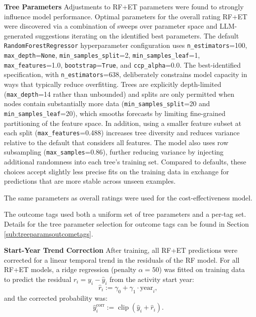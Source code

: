 \documentclass[12pt,a4paper]{article}
\begin{document}
\textbf{Tree Parameters} Adjustments to RF+ET parameters were found to strongly influence model performance. Optimal parameters for the overall rating RF+ET were discovered via a combination of sweeps over parameter space and LLM-generated suggestions iterating on the identified best parameters. The default \texttt{RandomForestRegressor} hyperparameter configuration uses \texttt{n\_estimators}=100, \texttt{max\_depth}=\texttt{None}, \texttt{min\_samples\_split}=2, \texttt{min\_samples\_leaf}=1, \texttt{max\_features}=1.0, \texttt{bootstrap}=\texttt{True}, and \texttt{ccp\_alpha}=0.0. The best-identified specification, with \texttt{n\_estimators}=638, deliberately constrains model capacity in ways that typically reduce overfitting. Trees are explicitly depth-limited (\texttt{max\_depth}=14 rather than unbounded) and splits are only permitted when nodes contain substantially more data (\texttt{min\_samples\_split}=20 and \texttt{min\_samples\_leaf}=20), which smooths forecasts by limiting fine-grained partitioning of the feature space. In addition, using a smaller feature subset at each split (\texttt{max\_features}=0.488) increases tree diversity and reduces variance relative to the default that considers all features. The model also uses row subsampling (\texttt{max\_samples}=0.86), further reducing variance by injecting additional randomness into each tree's training set. Compared to defaults, these choices accept slightly less precise fits on the training data in exchange for predictions that are more stable across unseen examples.

The same parameters as overall ratings were used for the cost-effectiveness model.

The outcome tags used both a uniform set of tree parameters and a per-tag set. Details for the tree parameter selection for outcome tags can be found in Section \ref{sub:treeparamsoutcometags}.

\textbf{Start-Year Trend Correction}
After training, all RF+ET predictions were corrected for a linear temporal trend in the residuals of the RF model.
For all RF+ET models, a ridge regression (penalty $\alpha=50$) was fitted on training data to predict the residual $r_i = y_i - \hat{y}_i$ from the activity start year:
\[
\hat{r}_i := \gamma_0 + \gamma_1 \cdot \text{year}_i ,
\]
and the corrected probability was:
\[
\hat{y}^{\text{corr}}_i := \operatorname{clip}\!\left(\hat{y}_i + \hat{r}_i\right).
\]
\end{document}
